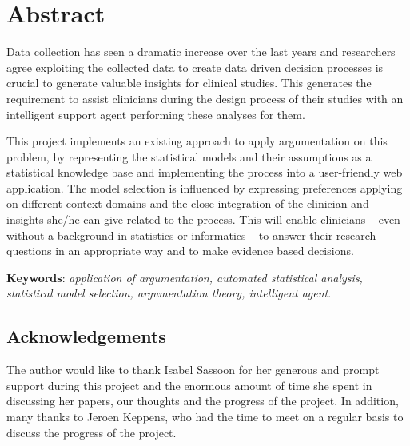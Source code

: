 \section*{Abstract}

Data collection has seen a dramatic increase over the last years and researchers agree exploiting the collected data to create data driven decision processes is crucial to generate valuable insights for clinical studies. This generates the requirement to assist clinicians during the design process of their studies with an intelligent support agent performing these analyses for them. 

This project implements an existing approach to apply argumentation on this problem, by representing the statistical models and their assumptions as a statistical knowledge base and implementing the process into a user-friendly web application. The model selection is influenced by expressing preferences applying on different context domains and the close integration of the clinician and insights she/he can give related to the process. This will enable clinicians -- even without a background in statistics or informatics -- to answer their research questions in an appropriate way and to make evidence based decisions. 

\bigskip
\bigskip

\textbf{Keywords}: \textit{application of argumentation, automated statistical analysis, statistical model selection, argumentation theory, intelligent agent}.

\bigskip
\bigskip

\subsection*{Acknowledgements}
The author would like to thank Isabel Sassoon for her generous and prompt support during this project and the enormous amount of time she spent in discussing her papers, our thoughts and the progress of the project. In addition, many thanks to Jeroen Keppens, who had the time to meet on a regular basis to discuss the progress of the project.